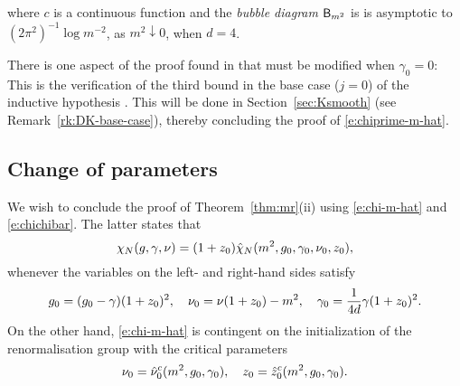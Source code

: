 where $c$ is a continuous function and the \emph{bubble diagram} ${\sf B}_{m^2}$ is
is asymptotic to $(2\pi^2)^{-1} \log m^{-2}$, as $m^2 \downarrow 0$, when $d = 4$.

\begin{rk}
There is one aspect of the proof found in \cite{BBS-saw4-log}
that must be modified when $\gamma_0 = 0$: This is the verification of the third bound
in the base case ($j = 0$) of the inductive hypothesis \cite[\eqref{log-e:induct1}]{BBS-saw4-log}.
This will be done in Section~\ref{sec:Ksmooth} (see Remark~\ref{rk:DK-base-case}),
thereby concluding the proof of \eqref{e:chiprime-m-hat}.
\end{rk}


\subsection{Change of parameters}
\label{sec:nuztilde}

We wish to conclude the proof of Theorem~\ref{thm:mr}(ii) using \eqref{e:chi-m-hat}
and \eqref{e:chichibar}. The latter states that
\begin{equation}
\label{e:chichihat}
\chi_N(g, \gamma, \nu)
	=
(1 + z_0) \hat\chi_N(m^2, g_0, \gamma_0, \nu_0, z_0),
\end{equation}
whenever the variables on the left- and right-hand sides satisfy
\begin{equation}
\label{e:gg0-re}
g_0 = (g_0 - \gamma) (1 + z_0)^2,
\quad
\nu_0 = \nu (1 + z_0) - m^2,
\quad
\gamma_0 = \frac{1}{4d} \gamma (1 + z_0)^2.
\end{equation}
On the other hand, \eqref{e:chi-m-hat} is contingent on the initialization of
the renormalisation group with the critical parameters
\begin{equation}
\label{e:crit-constraint}
\nu_0 = \hat \nu_0^c(m^2, g_0, \gamma_0),
	\quad
z_0   = \hat z_0^c(m^2, g_0, \gamma_0).
\end{equation}

